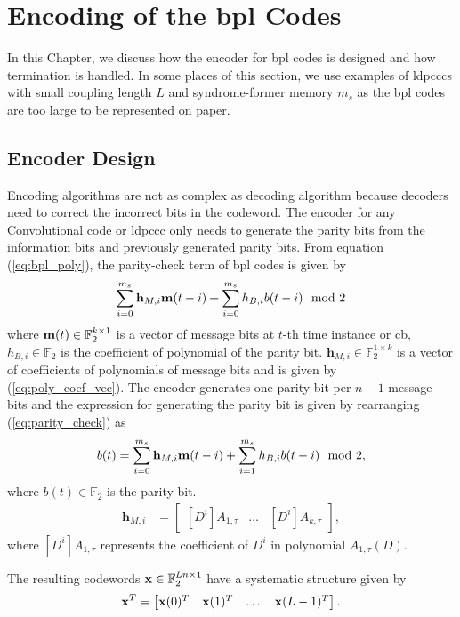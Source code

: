 \chapter{Encoding of the \acrlong{bpl} Codes}\label{ch:encode}
In this Chapter, we discuss how the encoder for \gls{bpl} codes is designed and how termination is handled. In some places of this section, we use examples of \glspl{ldpccc} with small coupling length $L$ and syndrome-former memory $m_s$ as the \gls{bpl} codes are too large to be represented on paper.

\section{Encoder Design}\label{sec:enc_design}
Encoding algorithms are not as complex as decoding algorithm because decoders need to correct the incorrect bits in the codeword. The encoder for any Convolutional code or \gls{ldpccc} only needs to generate the parity bits from the information bits and previously generated parity bits. From equation (\ref{eq:bpl_poly}), the parity-check term of \gls{bpl} codes is given by
\begin{align}\label{eq:parity_check}
\sum_{i=0}^{m_s}\mathbf{h}_{M,i}\mathbf{m}(t-i)+\sum_{i=0}^{m_s}h_{B,i}b(t-i) \mod 2
\end{align}
where $\mathbf{m}(t)\in\mathbb{F}_2^{k\times 1}$ is a vector of message bits at $t$-th time instance or \gls{cb}, $h_{B,i}\in\mathbb{F}_2$ is the coefficient of polynomial of the parity bit. $\mathbf{h}_{M,i}\in\mathbb{F}_2^{1\times k}$ is a vector of coefficients of polynomials of message bits and is given by (\ref{eq:poly_coef_vec}).
The encoder generates one parity bit per $n-1$ message bits and the expression for generating the parity bit is given by rearranging (\ref{eq:parity_check}) as
\begin{align}\label{eq:parity_bit}
b(t)=\sum_{i=0}^{m_s}\mathbf{h}_{M,i}\mathbf{m}(t-i)+\sum_{i=1}^{m_s}h_{B,i}b(t-i) \mod 2,
\end{align}
where $b(t)\in\mathbb{F}_2$ is the parity bit.
\begin{align}\label{eq:poly_coef_vec}
\mathbf{h}_{M,i}&=
\begin{bmatrix}
[D^i]A_{1,\tau} &\dots &[D^i]A_{k,\tau}
\end{bmatrix},
\end{align}
where $[D^i]A_{1,\tau}$ represents the coefficient of $D^i$ in polynomial $A_{1,\tau}(D)$.

The resulting codewords $\mathbf{x}\in\mathbb{F}_2^{Ln\times 1}$ have a systematic structure given by \begin{align}\mathbf{x}^T=\begin{bmatrix}\mathbf{x}(0)^T &\mathbf{x}(1)^T &\dots &\mathbf{x}(L-1)^T\end{bmatrix}.\end{align}

